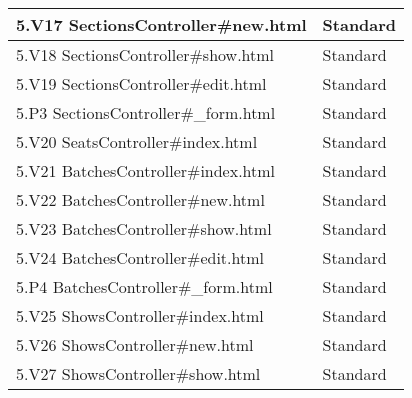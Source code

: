 \documentclass[a4paper, twoside, 11pt, titlepage]{article}
\begin{document}
\begin {table} [ht]
\begin{tabular} {  p{10cm} p{5.1cm} }
			\hline
			{ 5.V17 SectionsController\#new.html } & { Standard } \\
			\hline
			{ 5.V18 SectionsController\#show.html } & { Standard } \\
			\hline
			{ 5.V19 SectionsController\#edit.html } & { Standard } \\
			\hline
			{ 5.P3 SectionsController\#\_form.html } & { Standard } \\
			\hline
			{ 5.V20 SeatsController\#index.html } & { Standard } \\
			\hline
			{ 5.V21 BatchesController\#index.html } & { Standard } \\
			\hline
			{ 5.V22 BatchesController\#new.html } & { Standard } \\
			\hline
			{ 5.V23 BatchesController\#show.html } & { Standard } \\
			\hline
			{ 5.V24 BatchesController\#edit.html } & { Standard } \\
			\hline
			{ 5.P4 BatchesController\#\_form.html } & { Standard } \\
			\hline
			{ 5.V25 ShowsController\#index.html } & { Standard } \\
			\hline
			{ 5.V26 ShowsController\#new.html } & { Standard } \\
			\hline
			{ 5.V27 ShowsController\#show.html } & { Standard } \\
			\hline
		\end{tabular} \end{table} \FloatBarrier
		\vspace{6mm}
\end{document}
